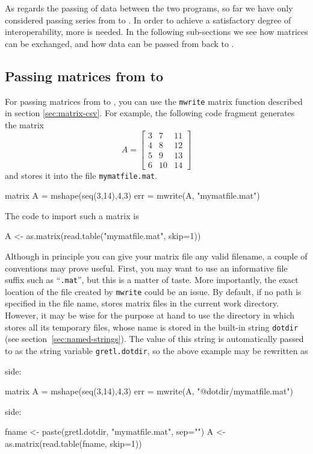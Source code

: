 As regards the passing of data between the two programs, so far we
have only considered passing series from  to . In
order to achieve a satisfactory degree of interoperability, more is
needed.  In the following sub-sections we see how matrices can be
exchanged, and how data can be passed from  back to
.

\subsection{Passing matrices from  to }

For passing matrices from  to , you can use the
\texttt{mwrite} matrix function described in section
\ref{sec:matrix-csv}. For example, the following  code
fragment generates the matrix 
\[ 
A = \left[
  \begin{array}{ccc}
    3 &  7 &  11 \\ 
    4 &  8 &  12 \\ 
    5 &  9 &  13 \\ 
    6 & 10 &  14 
  \end{array}
\right]
\] 
and stores it into the file \texttt{mymatfile.mat}.
\begin{code}
  matrix A = mshape(seq(3,14),4,3)
  err = mwrite(A, "mymatfile.mat")
\end{code}
The  code to import such a matrix is
\begin{code}
  A <- as.matrix(read.table("mymatfile.mat", skip=1))
\end{code}

Although in principle you can give your matrix file any valid
filename, a couple of conventions may prove useful. First, you may
want to use an informative file suffix such as ``\texttt{.mat}'', but
this is a matter of taste. More importantly, the exact location of the
file created by \texttt{mwrite} could be an issue. By default, if no
path is specified in the file name,  stores matrix files in
the current work directory. However, it may be wise for the purpose at
hand to use the directory in which  stores all its
temporary files, whose name is stored in the built-in string
\texttt{dotdir} (see section~\ref{sec:named-strings}). The value of
this string is automatically passed to  as the string variable
\texttt{gretl.dotdir}, so the above example may be rewritten as

 side:
\begin{code}
  matrix A = mshape(seq(3,14),4,3)
  err = mwrite(A, "@dotdir/mymatfile.mat")
\end{code}
 side:
\begin{code}
  fname <- paste(gretl.dotdir, "mymatfile.mat", sep="")
  A <- as.matrix(read.table(fname, skip=1))
\end{code}

